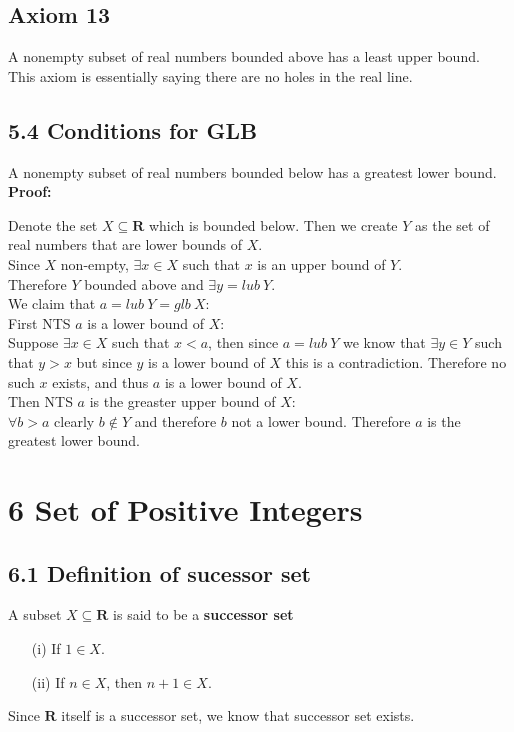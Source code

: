 \documentclass{article}
\begin{document}
\subsection*{Axiom 13}
A nonempty subset of real numbers bounded above has a least upper bound.\\
This axiom is essentially saying there are no holes in the real line.
\subsection*{5.4 Conditions for GLB}
A nonempty subset of real numbers bounded below has a greatest lower bound.\\
\textbf{Proof:}
\begin{addmargin}[1em]{0em}
    Denote the set $X \subseteq \mathbf{R}$ which is bounded below. Then we create $Y$ as the set of real numbers that are lower bounds of $X$.\\
    Since $X$ non-empty, $\exists x \in X$ such that $x$ is an upper bound of $Y$.\\
    Therefore $Y$ bounded above and $\exists y = lub\ Y$.\\
    We claim that $a = lub\ Y = glb\ X$:\\
    First NTS $a$ is a lower bound of $X$:\\
    Suppose $\exists x \in X$ such that $x < a$, then since $a = lub\ Y$ we know that $\exists y \in Y$ such that $y > x$ but since $y$ is a lower bound of $X$ this is a contradiction. Therefore no such $x$ exists, and thus $a$ is a lower bound of $X$.\\
    Then NTS $a$ is the greaster upper bound of $X$:\\
    $\forall b > a$ clearly $b \notin Y$ and therefore $b$ not a lower bound. Therefore $a$ is the greatest lower bound.
\end{addmargin}
\section*{6 Set of Positive Integers}
\subsection*{6.1 Definition of sucessor set}
A subset $X \subseteq \mathbf{R}$ is said to be a \textbf{successor set}
\begin{itemize}
    \item[(i)] If $1 \in X$.
    \item[(ii)] If $n \in X$, then $n + 1 \in X$.
\end{itemize}
Since $\mathbf{R}$ itself is a successor set, we know that successor set exists.
\end{document}
